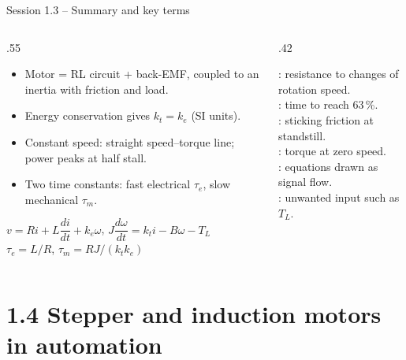 \documentclass[aspectratio=169,10pt]{beamer}
\begin{document}
\begin{frame}{Session 1.3 -- Summary and key terms}
\begin{columns}[T]
\begin{column}{.55\textwidth}
\small
\begin{itemize}
\item Motor = RL circuit + back-EMF, coupled to an inertia with friction and load.
\item Energy conservation gives $k_t=k_e$ (SI units).
\item Constant speed: straight speed--torque line; power peaks at half stall.
\item Two time constants: fast electrical $\tau_e$, slow mechanical $\tau_m$.
\end{itemize}
\begin{keybox}[Remember]
$v=Ri+L\dfrac{di}{dt}+k_e\omega$, \quad $J\dfrac{d\omega}{dt}=k_ti-B\omega-T_L$\\[1mm]
$\tau_e=L/R$, \quad $\tau_m=RJ/(k_tk_e)$
\end{keybox}
\end{column}
\begin{column}{.42\textwidth}
\begin{defbox}
\small
{}: resistance to changes of rotation speed.\\
: time to reach 63\,\%.\\
: sticking friction at standstill.\\
: torque at zero speed.\\
: equations drawn as signal flow.\\
: unwanted input such as $T_L$.
\end{defbox}
\end{column}
\end{columns}
\end{frame}

\section{1.4 Stepper and induction motors in automation}
\end{document}
